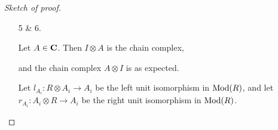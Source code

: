 \begin{proof}[Sketch of proof]
\begin{enumerate}
{\begin{center}
            \end{center}

            where the vertical morphisms are the expected natural morphisms, and the horizontal morphisms are the differentials.

            By uniqueness of a three-tensor version of \autoref{lem:map_out_of_tensor_unique}, it can be shown that the above diagram commutes. Let the composition of the vertical morphisms be the associativity chain morphism.
        }
        \item[5 \& 6.] {
            Let \( A \in \operatorname{\mathbf{C}} \). Then \( I \otimes A \) is the chain complex,
            \begin{center}
            \end{center}
            and the chain complex \( A \otimes I \) is as expected.

            Let \( l_{A_i}: R \otimes A_i \to A_i \) be the left unit isomorphism in \( \operatorname{Mod}(R) \), and let \( r_{A_i}: A_i \otimes R \to A_i \) be the right unit isomorphism in \( \operatorname{Mod}(R) \).

}
\end{enumerate}
\end{proof}
